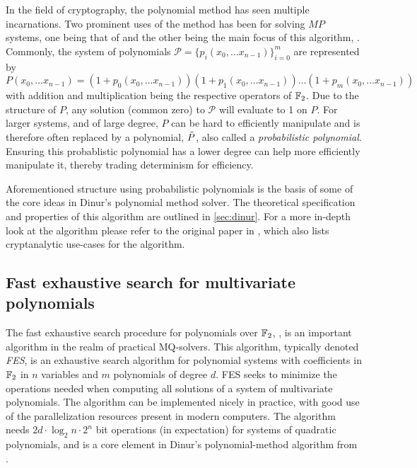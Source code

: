 In the field of cryptography, the polynomial method has seen multiple incarnations. Two prominent uses of the method has been for solving $MP$ systems, one being that of \cite{doi:10.1137/1.9781611974782.143} and the other being the main focus of this algorithm, \cite{eurocrypt-2021-30841}. Commonly, the system of polynomials $\mathcal{P} = \{p_i(x_0, \dots x_{n - 1})\}_{i = 0}^m$ are represented by 
$$
    P(x_0, \dots x_{n - 1}) = (1 + p_0(x_0, \dots x_{n - 1}))(1 + p_1(x_0, \dots x_{n - 1})) \dots (1 + p_m(x_0, \dots x_{n - 1}))
$$
with addition and multiplication being the respective operators of $\mathbb{F}_2$. Due to the structure of $P$, any solution (common zero) to $\mathcal{P}$ will evaluate to 1 on $P$. For larger systems, and of large degree, $P$ can be hard to efficiently manipulate and is therefore often replaced by a polynomial, $\Tilde{P}$, also called a \textit{probabilistic polynomial}. Ensuring this probablistic polynomial has a lower degree can help more efficiently manipulate it, thereby trading determinism for efficiency.

Aforementioned structure using probabilistic polynomials is the basis of some of the core ideas in Dinur's polynomial method solver. The theoretical specification and properties of this algorithm are outlined in \cref{sec:dinur}. For a more in-depth look at the algorithm please refer to the original paper in \cite{eurocrypt-2021-30841}, which also lists cryptanalytic use-cases for the algorithm.

\subsection{Fast exhaustive search for multivariate polynomials} \label{sec:prereq:fes}
The fast exhaustive search procedure for polynomials over $\mathbb{F}_2$, \cite{ches-2010-23990, cryptoeprint:2013/436},
is an important algorithm in the realm of practical MQ-solvers. This algorithm, typically denoted \textit{FES}, is an exhaustive search algorithm for polynomial systems with coefficients in $\mathbb{F}_2$ in $n$ variables and $m$ polynomials of degree $d$. FES seeks to minimize the operations needed when computing all solutions of a system of multivariate polynomials. The algorithm can be implemented nicely
in practice, with good use of the parallelization resources present in modern computers. The algorithm needs $2d\cdot \log_2n \cdot 2^n$ bit operations (in expectation)
for systems of quadratic polynomials, and is a core element in Dinur's polynomial-method algorithm from \cite{eurocrypt-2021-30841}.

